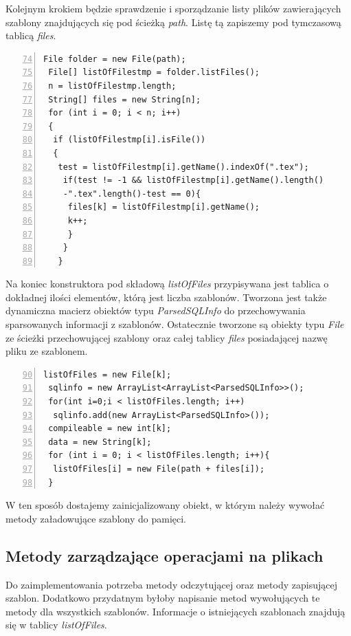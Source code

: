     
    Kolejnym krokiem będzie sprawdzenie i sporządzanie listy plików zawierających szablony znajdujących się pod ścieżką \emph{path}. Listę tą zapiszemy pod tymczasową tablicą  \emph{files}.
 \begin{lstlisting}[numbers=left,firstnumber=74]
 File folder = new File(path);
 File[] listOfFilestmp = folder.listFiles(); 
 n = listOfFilestmp.length;
 String[] files = new String[n];
 for (int i = 0; i < n; i++) 
 {
  if (listOfFilestmp[i].isFile()) 
  {
   test = listOfFilestmp[i].getName().indexOf(".tex");
    if(test != -1 && listOfFilestmp[i].getName().length()
    -".tex".length()-test == 0){
     files[k] = listOfFilestmp[i].getName();
     k++;
     }
    }
   }
\end{lstlisting}


Na koniec konstruktora pod składową \emph{listOfFiles} przypisywana jest tablica o dokładnej ilości elementów, którą jest liczba szablonów. Tworzona jest także dynamiczna macierz obiektów typu \emph{ParsedSQLInfo} do przechowywania sparsowanych informacji z szablonów. Ostatecznie tworzone są obiekty typu \emph{File} ze ścieżki przechowującej szablony oraz całej tablicy \emph{files} posiadającej nazwę pliku ze szablonem.
    
 \begin{lstlisting}[numbers=left,firstnumber=90]
 listOfFiles = new File[k];
 sqlinfo = new ArrayList<ArrayList<ParsedSQLInfo>>();
 for(int i=0;i < listOfFiles.length; i++)
  sqlinfo.add(new ArrayList<ParsedSQLInfo>());
 compileable = new int[k];
 data = new String[k];
 for (int i = 0; i < listOfFiles.length; i++){
  listOfFiles[i] = new File(path + files[i]);
 }
\end{lstlisting}
  
  W ten sposób dostajemy zainicjalizowany obiekt, w którym należy wywołać metody załadowujące szablony do pamięci.
  
  
\subsection{Metody zarządzające operacjami na plikach}

Do zaimplementowania potrzeba metody odczytującej oraz metody zapisującej szablon. Dodatkowo przydatnym byłoby napisanie metod wywołujących te metody dla wszystkich szablonów. Informacje o istniejących szablonach znajdują się w tablicy \emph{listOfFiles}. \\
\par
